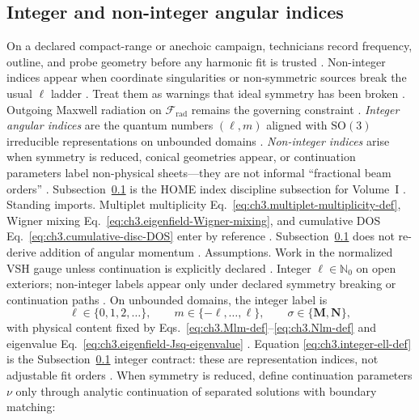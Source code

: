 \subsection{Integer and non-integer angular indices}
\label{sec:ch373}
On a declared compact-range or anechoic campaign, technicians record frequency, outline, and probe geometry before any harmonic fit is trusted \cite{hansen1988}. Non-integer indices appear when coordinate singularities or non-symmetric sources break the usual $\ell$ ladder \cite{stratton1941}. Treat them as warnings that ideal symmetry has been broken \cite{jackson1999}. Outgoing Maxwell radiation on $\mathcal{F}_{\mathrm{rad}}$ remains the governing constraint \cite{stratton1941}.
\emph{Integer angular indices} are the quantum numbers \((\ell,m)\) aligned with \(\mathrm{SO}(3)\) irreducible
representations on unbounded domains \cite{jackson1999}.
\emph{Non-integer indices} arise when symmetry is reduced, conical geometries appear, or continuation parameters label
non-physical sheets---they are not informal ``fractional beam orders'' \cite{harrington2001}. Subsection~\ref{sec:ch373}
is the HOME index discipline subsection for Volume~I \cite{hansen1988}.
Standing imports. Multiplet multiplicity Eq.~\eqref{eq:ch3.multiplet-multiplicity-def}, Wigner mixing
Eq.~\eqref{eq:ch3.eigenfield-Wigner-mixing}, and cumulative DOS Eq.~\eqref{eq:ch3.cumulative-disc-DOS} enter by
reference \cite{jackson1999}. Subsection~\ref{sec:ch373} does not re-derive addition of angular momentum
\cite{jackson1999}.
Assumptions. Work in the normalized VSH gauge unless continuation is explicitly declared \cite{hansen1988}. Integer
\(\ell\in\mathbb{N}_{0}\) on open exteriors; non-integer labels appear only under declared symmetry breaking or
continuation paths \cite{stratton1941}.
On unbounded domains, the integer label is
\begin{equation}
\label{eq:ch3.integer-ell-def}
\ell\in\{0,1,2,\ldots\},
\qquad
m\in\{-\ell,\ldots,\ell\},
\qquad
\sigma\in\{\mathbf{M},\mathbf{N}\},
\end{equation}
with physical content fixed by Eqs.~\eqref{eq:ch3.Mlm-def}--\eqref{eq:ch3.Nlm-def} and eigenvalue
Eq.~\eqref{eq:ch3.eigenfield-Jsq-eigenvalue} \cite{hansen1988}. Equation
\eqref{eq:ch3.integer-ell-def} is the Subsection~\ref{sec:ch373} integer contract: these are representation indices,
not adjustable fit orders \cite{harrington2001}.
When symmetry is reduced, define continuation parameters \(\nu\) only through analytic continuation of separated
solutions with boundary matching:
